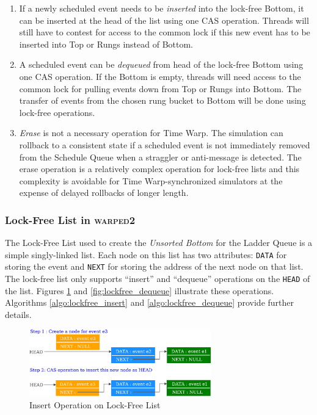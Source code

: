 \documentclass[11pt]{book}
\begin{document}
\begin{enumerate}

\item If a newly scheduled event needs to be \emph{inserted} into the lock-free Bottom, it can be inserted at
  the head of the list using one CAS operation.  Threads will still have to contest for access to the common
  lock if this new event has to be inserted into Top or Rungs instead of Bottom.

\item A scheduled event can be \emph{dequeued} from head of the lock-free Bottom using one CAS operation.  If
  the Bottom is empty, threads will need access to the common lock for pulling events down from Top or Rungs
  into Bottom.  The transfer of events from the chosen rung bucket to Bottom will be done using lock-free
  operations.
    
\item \emph{Erase} is not a necessary operation for Time Warp.  The simulation can rollback to a consistent
  state if a scheduled event is not immediately removed from the Schedule Queue when a straggler or
  anti-message is detected.  The erase operation is a relatively complex operation for lock-free lists and
  this complexity is avoidable for Time Warp-synchronized simulators at the expense of delayed rollbacks of
  longer length.

\end{enumerate}

\subsubsection{Lock-Free List in \textsc{warped2}}\label{subsubsec:lockfree_list}

The Lock-Free List used to create the \emph{Unsorted Bottom} for the Ladder Queue is a simple singly-linked
list.  Each node on this list has two attributes: \texttt{DATA} for storing the event and \texttt{NEXT} for
storing the address of the next node on that list.  The lock-free list only supports ``insert'' and
``dequeue'' operations on the \texttt{HEAD} of the list.  Figures \ref{fig:lockfree_insert} and
\ref{fig:lockfree_dequeue} illustrate these operations. Algorithms \ref{algo:lockfree_insert} and
\ref{algo:lockfree_dequeue} provide further details.

\begin{figure}
    \centering
    \includegraphics[width=0.7\textwidth]{figures/insert_lockfree.pdf}
    \caption{Insert Operation on Lock-Free List}\label{fig:lockfree_insert}
\end{figure}
\end{document}
